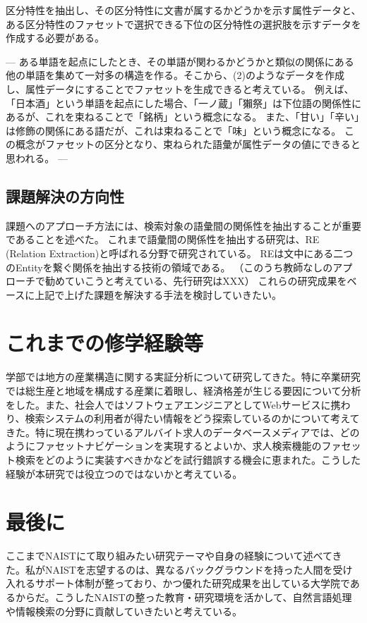 \documentclass[a4j,10pt, twocolumn]{jarticle} \usepackage[dvipdfmx]{graphicx} \usepackage{amssymb} \usepackage{amsmath}
\begin{document}
区分特性を抽出し、その区分特性に文書が属するかどうかを示す属性データと、ある区分特性のファセットで選択できる下位の区分特性の選択肢を示すデータを作成する必要がある。

---
ある単語を起点にしたとき、その単語が関わるかどうかと類似の関係にある他の単語を集めて一対多の構造を作る。そこから、(2)のようなデータを作成し、属性データにすることでファセットを生成できると考えている。
  例えば、「日本酒」という単語を起点にした場合、「一ノ蔵」「獺祭」は下位語の関係性にあるが、これを束ねることで「銘柄」という概念になる。
  また、「甘い」「辛い」は修飾の関係にある語だが、これは束ねることで「味」という概念になる。
  この概念がファセットの区分となり、束ねられた語彙が属性データの値にできると思われる。
---

\subsection{課題解決の方向性}
  課題へのアプローチ方法には、検索対象の語彙間の関係性を抽出することが重要であることを述べた。
  これまで語彙間の関係性を抽出する研究は、RE (Relation Extraction)と呼ばれる分野で研究されている。
  REは文中にある二つのEntityを繋ぐ関係を抽出する技術の領域である。
  （このうち教師なしのアプローチで勧めていこうと考えている、先行研究はXXX）
  これらの研究成果をベースに上記で上げた課題を解決する手法を検討していきたい。

\section{これまでの修学経験等}
 学部では地方の産業構造に関する実証分析について研究してきた。特に卒業研究では総生産と地域を構成する産業に着眼し、経済格差が生じる要因について分析をした。また、社会人ではソフトウェアエンジニアとしてWebサービスに携わり、検索システムの利用者が得たい情報をどう探索しているのかについて考えてきた。特に現在携わっているアルバイト求人のデータベースメディアでは、どのようにファセットナビゲーションを実現するとよいか、求人検索機能のファセット検索をどのように実装すべきかなどを試行錯誤する機会に恵まれた。こうした経験が本研究では役立つのではないかと考えている。

\section{最後に}
ここまでNAISTにて取り組みたい研究テーマや自身の経験について述べてきた。私がNAISTを志望するのは、異なるバックグラウンドを持った人間を受け入れるサポート体制が整っており、かつ優れた研究成果を出している大学院であるからだ。こうしたNAISTの整った教育・研究環境を活かして、自然言語処理や情報検索の分野に貢献していきたいと考えている。
\end{document}
